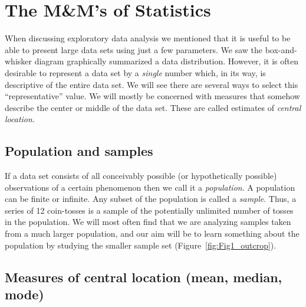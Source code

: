 \section{The M\&M's of Statistics}

	When discussing exploratory data analysis we mentioned that it is useful to be able to present 
large data sets using just a few parameters.  We saw the box-and-whisker diagram graphically 
summarized a data distribution.  However, it is often desirable to represent a data set by 
a \emph{single} number which, in its way, is descriptive of the entire data set.  We will see there are 
several ways to select this ``representative'' value.  We will mostly be concerned with measures 
that somehow describe the center or middle of the data set.  These are called estimates of 
\emph{central location}.

\subsection{Population and samples}

	If a data set consists of all conceivably possible (or hypothetically possible) observations of a 
certain phenomenon then we call it a \emph{population}.  A population can be finite or infinite.  Any subset 
of the population is called a \emph{sample}.  Thus, a series of 12 coin-tosses is a sample of the potentially 
unlimited number of tosses in the population.  We will most often find that we are analyzing 
samples taken from a much larger population, and our aim will be to learn something about the 
population by studying the smaller sample set (Figure~\ref{fig:Fig1_outcrop}).


\subsection{Measures of central location (mean, median, mode)}

